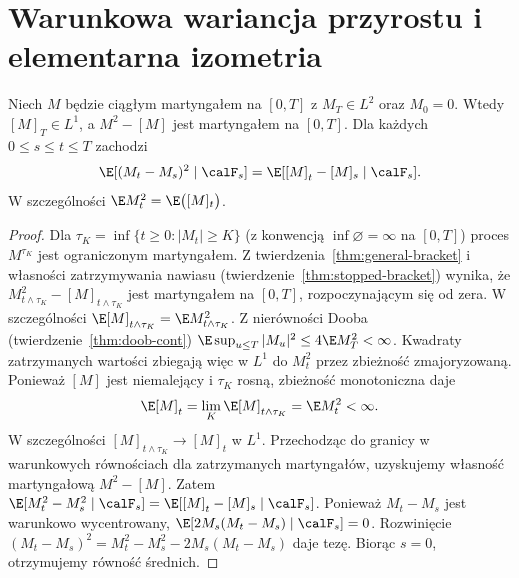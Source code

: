 \section{Warunkowa wariancja przyrostu i elementarna izometria}
\begin{twierdzenie}
\label{thm:conditional-variance-bracket}
Niech $M$ będzie ciągłym martyngałem na $[0,T]$
z $M_T\in L^2$ oraz $M_0=0$.
Wtedy $[M]_T\in L^1$, a $M^2-[M]$ jest
martyngałem na $[0,T]$.
Dla każdych $0\le s\le t\le T$ zachodzi
\[
\E[(M_t-M_s)^2\mid\calF_s]
=\E[[M]_t-[M]_s\mid\calF_s].
\]
W szczególności $\E M_t^2=\E\bigl([M]_t\bigr)$.
\end{twierdzenie}
\begin{proof}
Dla $\tau_K=\inf\{t\ge0:|M_t|\ge K\}$
(z konwencją $\inf\varnothing=\infty$ na $[0,T]$)
proces $M^{\tau_K}$ jest ograniczonym martyngałem.
Z twierdzenia~\ref{thm:general-bracket} i własności
zatrzymywania nawiasu (twierdzenie~\ref{thm:stopped-bracket})
wynika, że
$M_{t\wedge\tau_K}^2-[M]_{t\wedge\tau_K}$
jest martyngałem na $[0,T]$, rozpoczynającym się
od zera. W szczególności
$\E[M]_{t\wedge\tau_K}=\E M_{t\wedge\tau_K}^2$.
Z nierówności Dooba (twierdzenie~\ref{thm:doob-cont})
$\E\sup_{u\le T}|M_u|^2\le4\E M_T^2<\infty$.
Kwadraty zatrzymanych wartości zbiegają więc w $L^1$
do $M_t^2$ przez zbieżność zmajoryzowaną.
Ponieważ $[M]$ jest niemalejący i $\tau_K$ rosną,
zbieżność monotoniczna daje
\[
\E[M]_t=\lim_K\E[M]_{t\wedge\tau_K}=\E M_t^2<\infty.
\]
W szczególności $[M]_{t\wedge\tau_K}\to[M]_t$
w $L^1$. Przechodząc do granicy w warunkowych
równościach dla zatrzymanych martyngałów,
uzyskujemy własność martyngałową $M^2-[M]$.
Zatem
$\E[M_t^2-M_s^2\mid\calF_s]
=\E[[M]_t-[M]_s\mid\calF_s]$.
Ponieważ $M_t-M_s$ jest warunkowo wycentrowany,
$\E[2M_s(M_t-M_s)\mid\calF_s]=0$.
Rozwinięcie $(M_t-M_s)^2=M_t^2-M_s^2-2M_s(M_t-M_s)$
daje tezę. Biorąc $s=0$, otrzymujemy równość średnich.
\end{proof}

